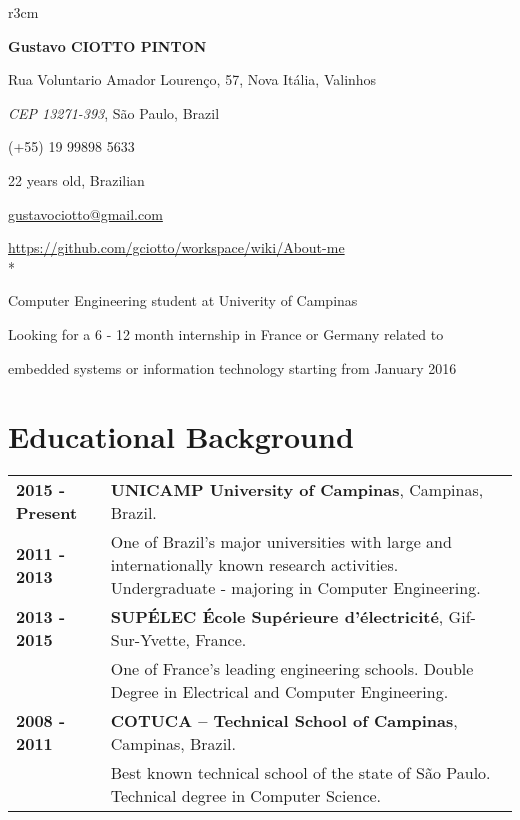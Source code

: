 \documentclass[10pt, a4paper]{article}
\author{Gustavo Ciotto Pinton}
\begin{document}
\pagestyle{empty} 

\begin{wrapfigure}{r}{3cm}
  \vspace{-20pt}
  \begin{center}
  \end{center}
\end{wrapfigure}

\textbf{\LARGE Gustavo CIOTTO PINTON}

Rua Voluntario Amador Lourenço, 57, Nova Itália, Valinhos

\textit{CEP 13271-393}, São Paulo, Brazil

(+55) 19 99898 5633	

22 years old, Brazilian

\url{gustavociotto@gmail.com} 

\url{https://github.com/gciotto/workspace/wiki/About-me}\\*

{\centerline {\large Computer Engineering student at Univerity of Campinas}} 

{\centerline {Looking for a 6 - 12 month internship in France or Germany
related to } }

{\centerline {embedded systems or information technology starting from January
2016 } }


\section{Educational Background}

\begin{tabular}{p{} p{}}

 \textbf{2015 - Present} & \textbf{UNICAMP University of
 Campinas}, Campinas, Brazil.
 \\
 \textbf{2011 - 2013} & One of Brazil’s major universities with large and
 internationally known research activities. Undergraduate -  majoring in
 Computer Engineering.
 \\

 \textbf{2013 - 2015} & \textbf{SUPÉLEC  École Supérieure d'électricité},
 Gif-Sur-Yvette, France. \\
 & One of France's leading engineering schools. Double Degree
 in Electrical and Computer Engineering. \\

 
 \textbf{2008 - 2011} & \textbf{COTUCA – Technical School of Campinas},
 Campinas, Brazil. \\
 & Best known technical school of the state of São Paulo. Technical degree in
 Computer Science.  \\
\end{tabular}
\end{document}
